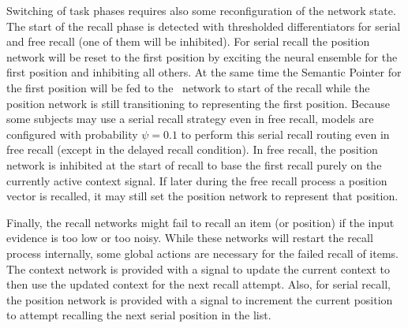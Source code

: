 Switching of task phases requires also some reconfiguration of the network state.
The start of the recall phase is detected with thresholded differentiators for serial and free recall (one of them will be inhibited).
For serial recall the position network will be reset to the first position by exciting the neural ensemble for the first position and inhibiting all others.
At the same time the Semantic Pointer for the first position will be fed to the \mft\ network to start of the recall while the position network is still transitioning to representing the first position.
Because some subjects may use a serial recall strategy even in free recall, models are configured with probability $\psi = 0.1$ to perform this serial recall routing even in free recall (except in the delayed recall condition).
In free recall, the position network is inhibited at the start of recall to base the first recall purely on the currently active context signal.
If later during the free recall process a position vector is recalled, it may still set the position network to represent that position.

Finally, the recall networks might fail to recall an item (or position) if the input evidence is too low or too noisy.
While these networks will restart the recall process internally, some global actions are necessary for the failed recall of items.
The context network is provided with a signal to update the current context to then use the updated context for the next recall attempt.
Also, for serial recall, the position network is provided with a signal to increment the current position to attempt recalling the next serial position in the list.
